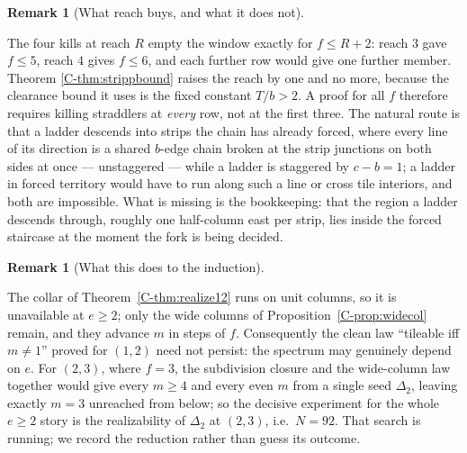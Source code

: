 \documentclass[11pt,reqno]{amsart}
\theoremstyle{plain}
\theoremstyle{definition}
\newtheorem{remark}[theorem]{Remark}
\begin{document}
\begin{remark}[What reach buys, and what it does not]\label{O-reachlaw}

The four kills at reach $R$ empty the window exactly for $f\le R+2$: reach $3$ gave $f\le5$,
reach $4$ gives $f\le6$, and each further row would give one further member. Theorem
\ref{C-thm:strippbound} raises the reach by one and no more, because the clearance bound it uses is
the fixed constant $T/b>2$. A proof for all $f$ therefore requires killing straddlers at
\emph{every} row, not at the first three. The natural route is that a ladder descends into strips
the chain has already forced, where every line of its direction is a shared $b$-edge chain broken
at the strip junctions on both sides at once --- unstaggered --- while a ladder is staggered by
$c-b=1$; a ladder in forced territory would have to run along such a line or cross tile interiors,
and both are impossible. What is missing is the bookkeeping: that the region a ladder descends
through, roughly one half-column east per strip, lies inside the forced staircase at the moment
the fork is being decided.
\end{remark}

\begin{remark}[What this does to the induction]\label{O-e2induction}

The collar of Theorem~\ref{C-thm:realize12} runs on unit columns, so it is unavailable at $e\ge2$;
only the wide columns of Proposition~\ref{C-prop:widecol} remain, and they advance $m$ in steps of
$f$. Consequently the clean law ``tileable iff $m\ne1$'' proved for $(1,2)$ need not persist:
the spectrum may genuinely depend on $e$. For $(2,3)$, where $f=3$, the subdivision closure and
the wide-column law together would give every $m\ge4$ and every even $m$ from a single seed
$\Delta_2$, leaving exactly $m=3$ unreached from below; so the decisive experiment for the whole
$e\ge2$ story is the realizability of $\Delta_2$ at $(2,3)$, i.e.\ $N=92$. That search is
running; we record the reduction rather than guess its outcome.
\end{remark}
\end{document}
